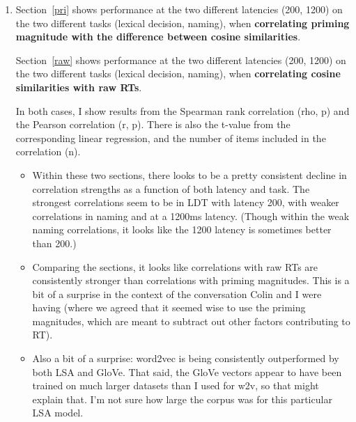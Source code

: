 \documentclass{article}
\begin{document}
\begin{enumerate}[1)]
\item Section~\ref{pri} shows performance at the two different latencies (200, 1200) on the two different tasks (lexical decision, naming), when \textbf{correlating priming magnitude with the difference between cosine similarities}. 

Section~\ref{raw} shows performance at the two different latencies (200, 1200) on the two different tasks (lexical decision, naming), when \textbf{correlating cosine similarities with raw RTs}. 

In both cases, I show results from the Spearman rank correlation (rho, p) and the Pearson correlation (r, p). There is also the t-value from the corresponding linear regression, and the number of items included in the correlation (n). 

\begin{itemize}

\item Within these two sections, there looks to be a pretty consistent decline in correlation strengths as a function of both latency and task. The strongest correlations seem to be in LDT with latency 200, with weaker correlations in naming and at a 1200ms latency. (Though within the weak naming correlations, it looks like the 1200 latency is sometimes better than 200.) 

\item Comparing the sections, it looks like correlations with raw RTs are consistently stronger than correlations with priming magnitudes. This is a bit of a surprise in the context of the conversation Colin and I were having (where we agreed that it seemed wise to use the priming magnitudes, which are meant to subtract out other factors contributing to RT). 

\item Also a bit of a surprise: word2vec is being consistently outperformed by both LSA and GloVe. That said, the GloVe vectors appear to have been trained on much larger datasets than I used for w2v, so that might explain that. I'm not sure how large the corpus was for this particular LSA model. 
\end{itemize}


\end{enumerate}
\end{document}

